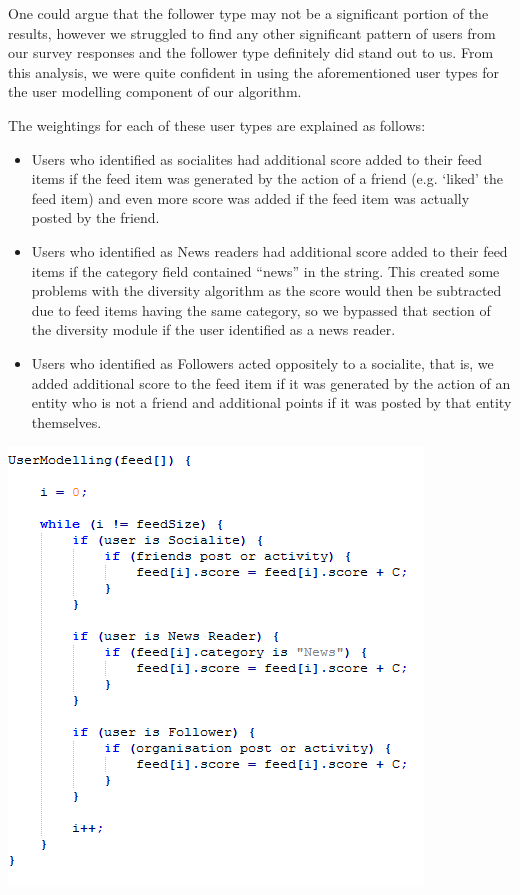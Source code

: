 One could argue that the follower type may not be a significant portion of the results, however we struggled to find any other significant pattern of users from our survey responses and the follower type definitely did stand out to us. From this analysis, we were quite confident in using the aforementioned user types for the user modelling component of our algorithm.

The weightings for each of these user types are explained as follows:
\begin{itemize}
\item Users who identified as socialites had additional score added to their feed items if the feed item was generated by the action of a friend (e.g. ‘liked’ the feed item) and even more score was added if the feed item was actually posted by the friend.
\item Users who identified as News readers had additional score added to their feed items if the category field contained “news” in the string. This created some problems with the diversity algorithm as the score would then be subtracted due to feed items having the same category, so we bypassed that section of the diversity module if the user identified as a news reader.
\item Users who identified as Followers acted oppositely to a socialite, that is, we added additional score to the feed item if it was generated by the action of an entity who is not a friend and additional points if it was posted by that entity themselves.
\end{itemize}

\begin{center}
\includegraphics[scale=0.8]{images/userModel.png}
\end{center}

